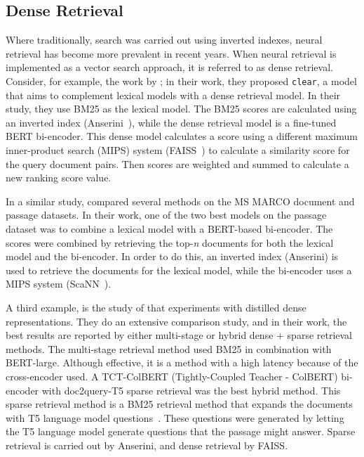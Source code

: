 \subsection{Dense Retrieval}
Where traditionally, search was carried out using inverted indexes, neural retrieval has become more prevalent in recent years. When neural retrieval \citep{neural-ir} is implemented as a vector search approach, it is referred to as dense retrieval.
Consider, for example, the work by \citet{dense-retrieval-1}; in their work, they proposed \texttt{clear}, a model that aims to complement lexical models with a dense retrieval model. In their study, they use BM25 as the lexical model. The BM25 scores are calculated using an inverted index (Anserini~\citep{anserini}), while the dense retrieval model is a fine-tuned BERT bi-encoder. This dense model calculates a score using a different maximum inner-product search (MIPS) system (FAISS~\citep{faiss}) to calculate a similarity score for the query document pairs. Then scores are weighted and summed to calculate a new ranking score value. 

In a similar study, \citet{dense-retrieval-2} compared several methods on the MS MARCO document and passage datasets. In their work, one of the two best models on the passage dataset was to combine a lexical model with a BERT-based bi-encoder. The scores were combined by retrieving the top-\textit{n} documents for both the lexical model and the bi-encoder. In order to do this, an inverted index (Anserini) is used to retrieve the documents for the lexical model, while the bi-encoder uses a MIPS system (ScaNN~\citep{scann}).

A third example, is the study of  \citet{dense-retrieval-3} that experiments with distilled dense representations. They do an extensive comparison study, and in their work, the best results are reported by either multi-stage or hybrid dense + sparse retrieval methods. The multi-stage retrieval method used BM25 in combination with BERT-large. Although effective, it is a method with a high latency because of the cross-encoder used. A TCT-ColBERT (Tightly-Coupled Teacher - ColBERT) bi-encoder with doc2query-T5 sparse retrieval was the best hybrid method. This sparse retrieval method is a BM25 retrieval method that expands the documents with T5 language model questions~\citep{2020t5}. These questions were generated by letting the T5 language model generate questions that the passage might answer. Sparse retrieval is carried out by Anserini, and dense retrieval by FAISS. 

